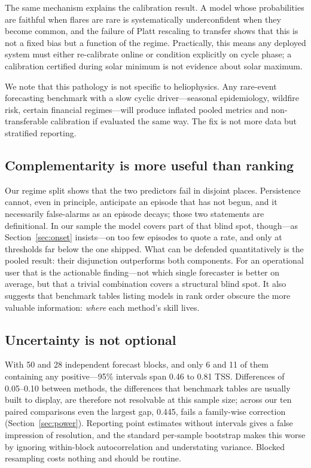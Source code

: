 \documentclass[11pt]{article}
\begin{document}
The same mechanism explains the calibration result. A model whose probabilities
are faithful when flares are rare is systematically underconfident when they
become common, and the failure of Platt rescaling to transfer shows that this is
not a fixed bias but a function of the regime. Practically, this means any
deployed system must either re-calibrate online or condition explicitly on cycle
phase; a calibration certified during solar minimum is not evidence about solar
maximum.

We note that this pathology is not specific to heliophysics. Any rare-event
forecasting benchmark with a slow cyclic driver---seasonal epidemiology, wildfire
risk, certain financial regimes---will produce inflated pooled metrics and
non-transferable calibration if evaluated the same way. The fix is not more data
but stratified reporting.

\subsection{Complementarity is more useful than ranking}

Our regime split shows that the two predictors fail in disjoint places.
Persistence cannot, even in principle, anticipate an episode that has not begun,
and it necessarily false-alarms as an episode decays; those two statements are
definitional. In our sample the model covers part of that blind spot,
though---as Section~\ref{sec:onset} insists---on too few episodes to quote a
rate, and only at thresholds far below the one shipped. What can be defended
quantitatively is the pooled result: their disjunction outperforms both
components. For an operational user that is the actionable finding---not which
single forecaster is better on average, but that a trivial combination covers a
structural blind spot. It also suggests that benchmark tables listing models in
rank order obscure the more valuable information: \emph{where} each method's
skill lives.

\subsection{Uncertainty is not optional}

With 50 and 28 independent forecast blocks, and only 6 and 11 of them containing
any positive---95\% intervals span 0.46 to 0.81 TSS. Differences of 0.05--0.10
between methods, the differences that benchmark tables are usually built to
display, are therefore not resolvable at this sample size; across our ten
paired comparisons even the largest gap, 0.445, fails a family-wise correction
(Section~\ref{sec:power}). Reporting
point
estimates without intervals gives a false impression of resolution, and the
standard per-sample bootstrap makes this worse by ignoring within-block
autocorrelation and understating variance. Blocked resampling costs nothing and
should be routine.
\end{document}
